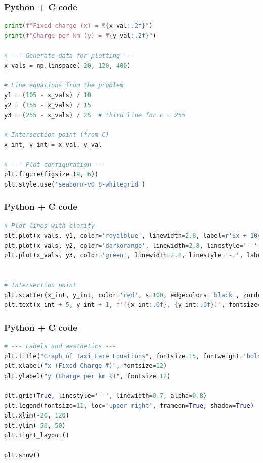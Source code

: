 \documentclass{beamer}
\begin{document}
\begin{frame}[fragile]
    \frametitle{Python + C code}

    \begin{lstlisting}[language=Python]
print(f"Fixed charge (x) = ₹{x_val:.2f}")
print(f"Charge per km (y) = ₹{y_val:.2f}")

# --- Generate data for plotting ---
x_vals = np.linspace(-20, 120, 400)

# Line equations from the problem
y1 = (105 - x_vals) / 10
y2 = (155 - x_vals) / 15
y3 = (255 - x_vals) / 25  # third line for c = 255

# Intersection point (from C)
x_int, y_int = x_val, y_val

# --- Plot configuration ---
plt.figure(figsize=(9, 6))
plt.style.use('seaborn-v0_8-whitegrid')
\end{lstlisting}
\end{frame}
\begin{frame}[fragile]
\frametitle{Python + C code}
    \begin{lstlisting}[language=Python]
        # Plot lines with clarity
plt.plot(x_vals, y1, color='royalblue', linewidth=2.8, label=r'$x + 10y = 105$')
plt.plot(x_vals, y2, color='darkorange', linewidth=2.8, linestyle='--', label=r'$x + 15y = 155$')
plt.plot(x_vals, y3, color='green', linewidth=2.8, linestyle='-.', label=r'$x + 25y = 255$')


# Intersection point
plt.scatter(x_int, y_int, color='red', s=100, edgecolors='black', zorder=5, label=f'Intersection ({x_int:.0f}, {y_int:.0f})')
plt.text(x_int + 5, y_int + 1, f'({x_int:.0f}, {y_int:.0f})', fontsize=12, color='red', fontweight='bold')
    \end{lstlisting}
\end{frame}
\begin{frame}[fragile]
\frametitle{Python + C code}
    \begin{lstlisting}[language=Python]
# --- Labels and aesthetics ---
plt.title("Graph of Taxi Fare Equations", fontsize=15, fontweight='bold')
plt.xlabel("x (Fixed Charge ₹)", fontsize=12)
plt.ylabel("y (Charge per km ₹)", fontsize=12)

plt.grid(True, linestyle='--', linewidth=0.7, alpha=0.8)
plt.legend(fontsize=11, loc='upper right', frameon=True, shadow=True)
plt.xlim(-20, 120)
plt.ylim(-50, 50)
plt.tight_layout()

plt.show()

     \end{lstlisting}
\end{frame}
\end{document}
